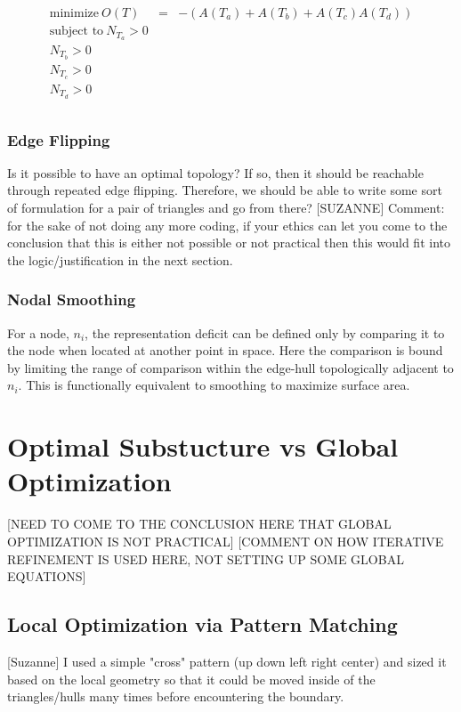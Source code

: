 \documentclass[11pt]{article}
\begin{document}
\begin{eqnarray*}
\begin{array}{rcl}
\text{minimize} \ O(T) & = & -\left(A\left(T_a\right) + A\left(T_b\right) + A\left(T_c\right) A\left(T_d\right) \right) \\
\text{subject to} \ N_{T_a} > 0 \\
N_{T_b} > 0 \\ 
N_{T_c} > 0 \\
N_{T_d} > 0 \\
\end{array}
\end{eqnarray*}

\subsubsection{Edge Flipping}
Is it possible to have an optimal topology? If so, then it should be
reachable through repeated edge flipping. Therefore, we should be able
to write some sort of formulation for a pair of triangles and go from
there? [SUZANNE] Comment: for the sake of not doing any more coding, if
your ethics can let you come to the conclusion that this is either not
possible or not practical then this would fit into the
logic/justification in the next section.

\subsubsection{Nodal Smoothing}
For a node, $n_i$, the representation deficit can be defined only by
comparing it to the node when located at another point in space. Here
the comparison is bound by limiting the range of comparison within the
edge-hull topologically adjacent to $n_i$. This is functionally
equivalent to smoothing to maximize surface area.

\section{Optimal Substucture vs Global Optimization}
[NEED TO COME TO THE CONCLUSION HERE THAT GLOBAL OPTIMIZATION IS NOT
PRACTICAL] [COMMENT ON HOW ITERATIVE REFINEMENT IS USED HERE, NOT
SETTING UP SOME GLOBAL EQUATIONS]
\subsection{Local Optimization via Pattern Matching}
[Suzanne] I used a simple "cross" pattern (up down left right center)
and sized it based on the local geometry so that it could be moved
inside of the triangles/hulls many times before encountering the
boundary.
\end{document}
